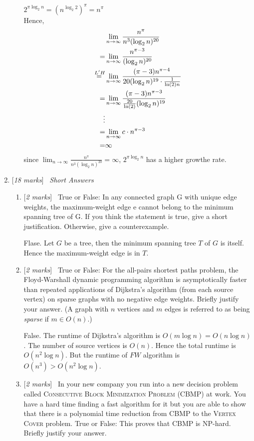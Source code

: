 \documentclass[11pt]{article}
\newcommand{\Q}[1]{\medskip\item {[{\em #1 marks\/}]}\ }
\newcommand*\Heq{\ensuremath{\overset{\kern2pt L'H}{=}}}
\begin{document}
\begin{enumerate}
\begin{enumerate}
$2^{\pi \log_2 n} = (n^{\log_2 2})^\pi = n^{\pi}$\\
Hence,
\begin{align*}
    &\lim_{n \to \infty} \frac {n^{\pi}} {n^3 (\log_2 n)^{20}}\\
    = & \lim_{n \to \infty} \frac {n^{\pi - 3}} {(\log_2 n)^{20}}\\
    \Heq & \lim_{n \to \infty} \frac {(\pi - 3) n^{\pi - 4}} {20(\log_2 n)^{19} \cdot \frac {1} {\ln(2) n}}\\
    = & \lim_{n \to \infty} \frac {(\pi - 3) n^{\pi - 3}} {\frac {20} {\ln(2)} (\log_2 n)^{19}}\\
    \vdots & \\
    = & \lim_{n \to \infty} c \cdot n^{\pi - 3} \\
    = & \infty
\end{align*}
since $\lim_{n \to \infty} \frac {n^{\pi}} {n^3 (\log_2 n)^{20}} = \infty$, $2^{\pi \log_2 n}$ has a higher 
growthe rate.

\end{enumerate}

\newpage
\Q{18} {\em Short Answers}
\begin{enumerate}
\Q{2} True or False: In any connected graph G with unique edge weights, the maximum-weight edge e cannot belong to the minimum spanning tree of G. If you think the statement is true, give a short justification. Otherwise, give a counterexample.

Flase. Let $G$ be a tree, then the minimum spanning tree $T$ of $G$ is itself. Hence the maximum-weight edge is in $T$.

\newpage
\Q{2} True or False: For the all-pairs shortest paths problem, the Floyd-Warshall dynamic programming algorithm is asymptotically faster than repeated applications of Dijkstra's algorithm (from each source vertex) on sparse graphs with no negative edge weights. Briefly justify your answer. (A graph with $n$ vertices and $m$ edges is referred to as being \textit{sparse} if $m \in O(n)$.)

False. The runtime of Dijkstra's algorithm is $O(m \log n) = O(n \log n)$. The number of source vertices is 
$O(n)$. Hence the total runtime is $O(n^2 \log n)$. But the runtime of $FW$ algorithm is 
$O(n^3) > O(n^2 \log n)$.

\newpage
\Q{2} In your new company you run into a new decision problem called \textsc{Consecutive Block Minimization Problem (CBMP)} at work. You have a hard time finding a fast algorithm for it but you are able to show that there is 
a polynomial time reduction from \textsc{CBMP} to the  \textsc{Vertex Cover} problem. True or False: This proves that \textsc{CBMP} is NP-hard. Briefly justify your answer.


\end{enumerate}
\end{enumerate}
\end{document}
